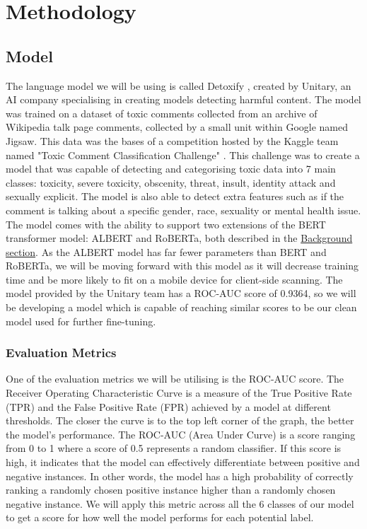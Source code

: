 \chapter{Methodology}

\section{Model}

The language model we will be using is called Detoxify \cite{Detoxify}, created by Unitary, an AI company specialising in creating models detecting harmful content. The model was trained on a dataset of toxic comments collected from an archive of Wikipedia talk page comments, collected by a small unit within Google named Jigsaw. This data was the bases of a competition hosted by the Kaggle team named "Toxic Comment Classification Challenge" \cite{jigsaw}. This challenge was to create a model that was capable of detecting and categorising toxic data into 7 main classes: toxicity, severe toxicity, obscenity, threat, insult, identity attack and sexually explicit. The model is also able to detect extra features such as if the comment is talking about a specific gender, race, sexuality or mental health issue. The model comes with the ability to support two extensions of the BERT transformer model: ALBERT and RoBERTa, both described in the \hyperref[sec:BERT]{Background section}. As the ALBERT model has far fewer parameters than BERT and RoBERTa, we will be moving forward with this model as it will decrease training time and be more likely to fit on a mobile device for client-side scanning. The model provided by the Unitary team has a ROC-AUC score of 0.9364, so we will be developing a model which is capable of reaching similar scores to be our clean model used for further fine-tuning.

\subsection{Evaluation Metrics}

One of the evaluation metrics we will be utilising is the ROC-AUC score. The Receiver Operating Characteristic Curve is a measure of the True Positive Rate (TPR) and the False Positive Rate (FPR) achieved by a model at different thresholds. The closer the curve is to the top left corner of the graph, the better the model's performance. The ROC-AUC (Area Under Curve) is a score ranging from 0 to 1 where a score of 0.5 represents a random classifier. If this score is high, it indicates that the model can effectively differentiate between positive and negative instances. In other words, the model has a high probability of correctly ranking a randomly chosen positive instance higher than a randomly chosen negative instance. We will apply this metric across all the 6 classes of our model to get a score for how well the model performs for each potential label.

